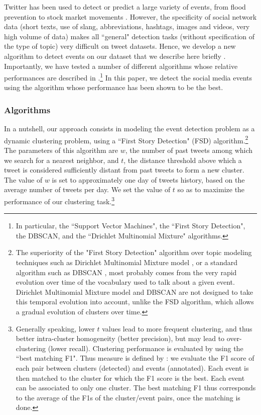 Twitter has been used to detect or predict a large variety of events, from flood prevention \citep{de2017towards} to stock market movements \citep{pagolu2016sentiment}. However, the specificity of social network data (short texts, use of slang, abbreviations, hashtags, images and videos, very high volume of data) makes all ``general" detection tasks (without specification of the type of topic) very difficult on tweet datasets. Hence, we develop a new algorithm to detect events on our dataset that we describe here briefly \citep[see][for more details and a description of the state of the art in the computer science literature]{MazoyerHerveHudelotCage2020}. Importantly, we have tested a number of different algorithms whose relative performances are described in \citet{MazoyerHerveHudelotCage2020}.\footnote{In particular, the ``Support Vector Machines", the ``First Story Detection", the DBSCAN, and the ``Drichlet Multinomial Mixture" algorithms.} In this paper, we detect the social media events using the algorithm whose performance has been shown to be the best.


\subsubsection{Algorithms}

In a nutshell, our approach consists in modeling the event detection problem as a dynamic clustering problem, using a ``First Story Detection" (FSD) algorithm.\footnote{The superiority of the "First Story Detection" algorithm over topic modeling techniques such as Dirichlet Multinomial Mixture model \citep{yin_dirichlet_2014}, or a standard algorithm such as DBSCAN \citep{ester1996density}, most probably comes from the very rapid evolution over time of the vocabulary used to talk about a given event. Dirichlet Multinomial Mixture model and DBSCAN are not designed to take this temporal evolution into account, unlike the FSD algorithm, which allows a gradual evolution of clusters over time.} The parameters of this algorithm are $w$, the number of past tweets among which we search for a nearest neighbor, and $t$, the distance threshold above which a tweet is considered sufficiently distant from past tweets to form a new cluster. The value of $w$ is set to approximately one day of tweets history, based on the average number of tweets per day. We set the value of $t$ so as to maximize the performance of our clustering task.\footnote{Generally speaking, lower $t$ values lead to more frequent clustering, and thus better intra-cluster homogeneity (better precision), but may lead to over-clustering (lower recall). Clustering performance is evaluated by using the ``best matching F1". Thus measure is defined by \citet{yang1998study}: we evaluate the F1 score of each pair between clusters (detected) and events (annotated). Each event is then matched to the cluster for which the F1 score is the best. Each event can be associated to only one cluster. The best matching F1 thus corresponds to the average of the F1s of the cluster/event pairs, once the matching is done.} 

